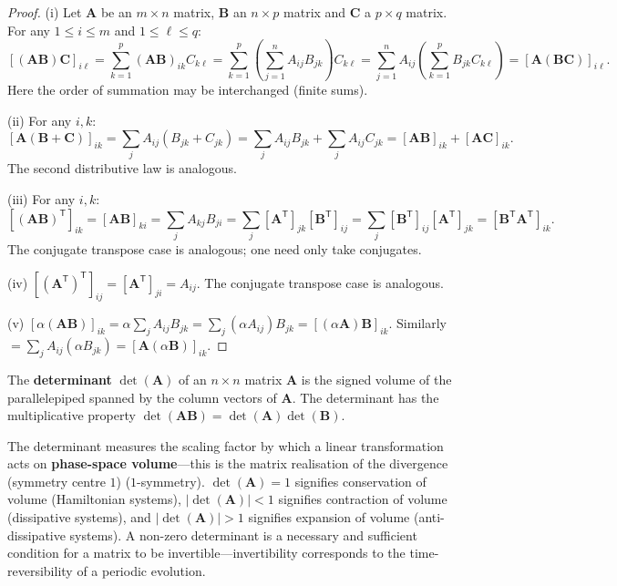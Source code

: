 \begin{proof}
(i) Let $\mathbf{A}$ be an $m \times n$ matrix, $\mathbf{B}$ an $n \times p$ matrix and $\mathbf{C}$ a $p \times q$ matrix. For any $1 \le i \le m$ and $1 \le \ell \le q$:
\[
[(\mathbf{A}\mathbf{B})\mathbf{C}]_{i\ell} = \sum_{k=1}^p (\mathbf{A}\mathbf{B})_{ik} C_{k\ell} = \sum_{k=1}^p \left(\sum_{j=1}^n A_{ij}B_{jk}\right) C_{k\ell} = \sum_{j=1}^n A_{ij}\left(\sum_{k=1}^p B_{jk}C_{k\ell}\right) = [\mathbf{A}(\mathbf{B}\mathbf{C})]_{i\ell}.
\]
Here the order of summation may be interchanged (finite sums).

(ii) For any $i,k$:
\[
[\mathbf{A}(\mathbf{B}+\mathbf{C})]_{ik} = \sum_j A_{ij}(B_{jk}+C_{jk}) = \sum_j A_{ij}B_{jk} + \sum_j A_{ij}C_{jk} = [\mathbf{A}\mathbf{B}]_{ik} + [\mathbf{A}\mathbf{C}]_{ik}.
\]
The second distributive law is analogous.

(iii) For any $i,k$:
\[
[(\mathbf{A}\mathbf{B})^{\mathsf T}]_{ik} = [\mathbf{A}\mathbf{B}]_{ki} = \sum_j A_{kj}B_{ji} = \sum_j [\mathbf{A}^{\mathsf T}]_{jk}[\mathbf{B}^{\mathsf T}]_{ij} = \sum_j [\mathbf{B}^{\mathsf T}]_{ij}[\mathbf{A}^{\mathsf T}]_{jk} = [\mathbf{B}^{\mathsf T}\mathbf{A}^{\mathsf T}]_{ik}.
\]
The conjugate transpose case is analogous; one need only take conjugates.

(iv) $[(\mathbf{A}^{\mathsf T})^{\mathsf T}]_{ij} = [\mathbf{A}^{\mathsf T}]_{ji} = A_{ij}$. The conjugate transpose case is analogous.

(v) $[\alpha(\mathbf{A}\mathbf{B})]_{ik} = \alpha \sum_j A_{ij}B_{jk} = \sum_j (\alpha A_{ij})B_{jk} = [(\alpha\mathbf{A})\mathbf{B}]_{ik}$. Similarly $= \sum_j A_{ij}(\alpha B_{jk}) = [\mathbf{A}(\alpha\mathbf{B})]_{ik}$.
\end{proof}

\begin{definition}[Determinant]\label{def:determinant}
The \textbf{determinant} $\det(\mathbf{A})$ of an $n \times n$ matrix $\mathbf{A}$ is the signed volume of the parallelepiped spanned by the column vectors of $\mathbf{A}$. The determinant has the multiplicative property $\det(\mathbf{A}\mathbf{B}) = \det(\mathbf{A})\det(\mathbf{B})$.

The determinant measures the scaling factor by which a linear transformation acts on \textbf{phase-space volume}---this is the matrix realisation of the divergence (symmetry centre $1$) ($1$-symmetry). $\det(\mathbf{A}) = 1$ signifies conservation of volume (Hamiltonian systems), $|\det(\mathbf{A})| < 1$ signifies contraction of volume (dissipative systems), and $|\det(\mathbf{A})| > 1$ signifies expansion of volume (anti-dissipative systems). A non-zero determinant is a necessary and sufficient condition for a matrix to be invertible---invertibility corresponds to the time-reversibility of a periodic evolution.
\end{definition}

